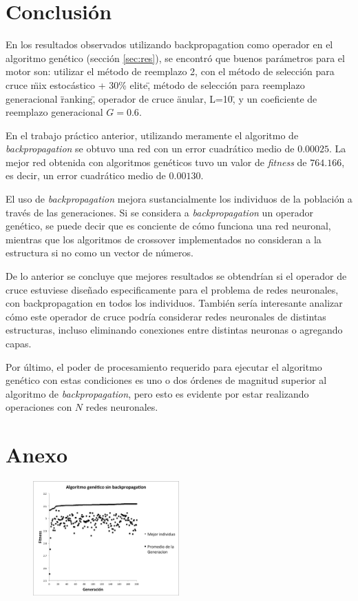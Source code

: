 \documentclass[letterpaper,twocolumn,10pt]{article}
\begin{document}
\section{Conclusión}

En los resultados observados utilizando backpropagation como operador en el 
algoritmo genético (sección \ref{sec:res}), se encontró que buenos
parámetros para el motor son: utilizar el método de reemplazo 2, con
el método de selección para cruce \"mix estocástico + 30\% elite\",
método de selección para reemplazo generacional \"ranking\", operador
de cruce \"anular, L=10\", y un coeficiente de reemplazo generacional $G=0.6$.

En el trabajo práctico anterior, utilizando meramente el algoritmo de
\textit{backpropagation} se obtuvo una red con un error cuadrático medio de $0.00025$. 
La mejor red obtenida con algoritmos genéticos tuvo un valor de \textit{fitness} de
$764.166$, es decir, un error cuadrático medio de $0.00130$.

El uso de \textit{backpropagation} mejora sustancialmente los individuos de la
población a través de las generaciones. Si se considera a \textit{backpropagation} un
operador genético, se puede decir que es conciente de cómo funciona una red neuronal,
mientras que los algoritmos de crossover implementados no consideran a la estructura
si no como un vector de números.

De lo anterior se concluye que mejores resultados se obtendrían si el operador de
cruce estuviese diseñado especificamente para el problema de redes neuronales, con
backpropagation en todos los individuos. También sería interesante analizar cómo
este operador de cruce podría considerar redes neuronales de distintas estructuras,
incluso eliminando conexiones entre distintas neuronas o agregando capas.

Por último, el poder de procesamiento requerido para ejecutar el algoritmo genético
con estas condiciones es uno o dos órdenes de magnitud superior al algoritmo de
\textit{backpropagation}, pero esto es evidente por estar realizando operaciones con
$N$ redes neuronales.

\newpage

\section{Anexo}

\begin{figure}[h]

\includegraphics[width=0.5\textwidth]{No_Backpropagation.png}

\caption{}
\label{img:no_backpropagation}

\end{figure}
\end{document}
